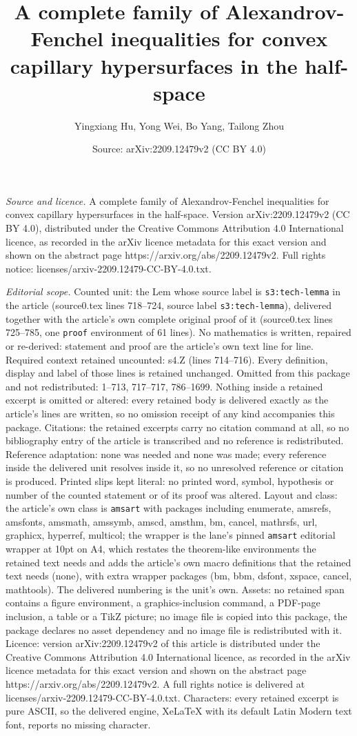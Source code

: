\documentclass[10pt,a4paper]{amsart}
\title[A complete family of Alexandrov-Fenchel inequalities for con]{A complete family of Alexandrov-Fenchel inequalities for convex capillary hypersurfaces in the half-space}
\author{Yingxiang Hu, Yong Wei, Bo Yang, Tailong Zhou}
\date{Source: arXiv:2209.12479v2 (CC BY 4.0)}
\begin{document}
\maketitle

\noindent\emph{Source and licence.} A complete family of Alexandrov-Fenchel inequalities for convex capillary hypersurfaces in the half-space. Version arXiv:2209.12479v2 (CC BY 4.0), distributed under the Creative Commons Attribution 4.0 International licence, as recorded in the arXiv licence metadata for this exact version and shown on the abstract page https://arxiv.org/abs/2209.12479v2. Full rights notice: licenses/arxiv-2209.12479-CC-BY-4.0.txt.\par\smallskip

\noindent\textit{Editorial scope.} Counted unit: the Lem whose source label is \texttt{s3:tech-lemma} in the article (source0.tex lines 718--724, source label \texttt{s3:tech-lemma}), delivered together with the article's own complete original proof of it (source0.tex lines 725--785, one \texttt{proof} environment of 61 lines). No mathematics is written, repaired or re-derived: statement and proof are the article's own text line for line. Required context retained uncounted: s4.Z (lines 714--716). Every definition, display and label of those lines is retained unchanged. Omitted from this package and not redistributed: 1--713, 717--717, 786--1699. Nothing inside a retained excerpt is omitted or altered: every retained body is delivered exactly as the article's lines are written, so no omission receipt of any kind accompanies this package. Citations: the retained excerpts carry no citation command at all, so no bibliography entry of the article is transcribed and no reference is redistributed. Reference adaptation: none was needed and none was made; every reference inside the delivered unit resolves inside it, so no unresolved reference or citation is produced. Printed slips kept literal: no printed word, symbol, hypothesis or number of the counted statement or of its proof was altered. Layout and class: the article's own class is \texttt{amsart} with packages including enumerate, amsrefs, amsfonts, amsmath, amssymb, amscd, amsthm, bm, cancel, mathrsfs, url, graphicx, hyperref, multicol; the wrapper is the lane's pinned \texttt{amsart} editorial wrapper at 10pt on A4, which restates the theorem-like environments the retained text needs and adds the article's own macro definitions that the retained text needs (none), with extra wrapper packages (bm, bbm, dsfont, xspace, cancel, mathtools). The delivered numbering is the unit's own. Assets: no retained span contains a figure environment, a graphics-inclusion command, a PDF-page inclusion, a table or a TikZ picture; no image file is copied into this package, the package declares no asset dependency and no image file is redistributed with it. Licence: version arXiv:2209.12479v2 of this article is distributed under the Creative Commons Attribution 4.0 International licence, as recorded in the arXiv licence metadata for this exact version and shown on the abstract page https://arxiv.org/abs/2209.12479v2. A full rights notice is delivered at licenses/arxiv-2209.12479-CC-BY-4.0.txt. Characters: every retained excerpt is pure ASCII, so the delivered engine, XeLaTeX with its default Latin Modern text font, reports no missing character.
\end{document}
